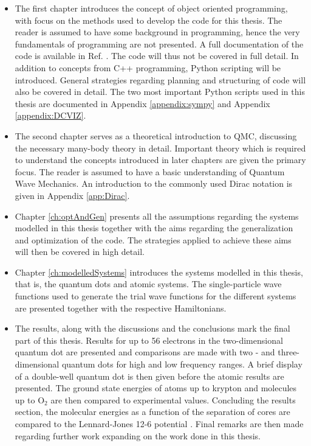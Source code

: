 \begin{itemize}
 \item The first chapter introduces the concept of object oriented programming, with focus on the methods used to develop the code for this thesis. The reader is assumed to have some background in programming, hence the very fundamentals of programming are not presented. A full documentation of the code is available in Ref. \cite{libBorealisCode}. The code will thus not be covered in full detail. In addition to concepts from C++ programming, Python scripting will be introduced. General strategies regarding planning and structuring of code will also be covered in detail. The two most important Python scripts used in this thesis are documented in Appendix \ref{appendix:sympy} and Appendix \ref{appendix:DCVIZ}.
 
 \item The second chapter serves as a theoretical introduction to QMC, discussing the necessary many-body theory in detail. Important theory which is required to understand the concepts introduced in later chapters are given the primary focus. The reader is assumed to have a basic understanding of Quantum Wave Mechanics. An introduction to the commonly used Dirac notation is given in Appendix \ref{app:Dirac}.
 
 \item Chapter \ref{ch:optAndGen} presents all the assumptions regarding the systems modelled in this thesis together with the aims regarding the generalization and optimization of the code. The strategies applied to achieve these aims will then be covered in high detail.
 
 \item Chapter \ref{ch:modelledSystems} introduces the systems modelled in this thesis, that is, the quantum dots and atomic systems. The single-particle wave functions used to generate the trial wave functions for the different systems are presented together with the respective Hamiltonians.
 
 \item The results, along with the discussions and the conclusions mark the final part of this thesis. Results for up to 56 electrons in the two-dimensional quantum dot are presented and comparisons are made with two - and three-dimensional quantum dots for high and low frequency ranges. A brief display of a double-well quantum dot is then given before the atomic results are presented. The ground state energies of atoms up to krypton and molecules up to $\mathrm{O_2}$ are then compared to experimental values. Concluding the results section, the molecular energies as a function of the separation of cores are compared to the Lennard-Jones 12-6 potential \cite{MD1, MD2}. Final remarks are then made regarding further work expanding on the work done in this thesis. 
\end{itemize}